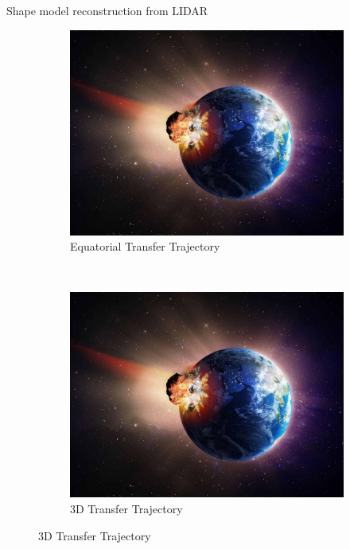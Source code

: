 \documentclass[final, usenames, dvipsnames]{beamer}
\newlength{\twocolwidth}
\begin{document}
\begin{frame}[t]
\begin{columns}[T,onlytextwidth]
\begin{column}{\twocolwidth}
\begin{block}{Shape model reconstruction from LIDAR}
\begin{figure}[htbp] 
    \centering 
    \begin{subfigure}[htbp]{0.5\textwidth} 
        \includegraphics[width=\textwidth,draft]{figures/asteroid-alamy.jpg} 
        \caption{Equatorial Transfer Trajectory}
    \end{subfigure}~ %
    \begin{subfigure}[htbp]{0.5\textwidth} 
        \includegraphics[width=\textwidth,draft]{figures/asteroid-alamy.jpg} 
        \caption*{3D Transfer Trajectory}
    \end{subfigure}
 

\end{figure}
\end{block}
\end{column}
\end{columns}
\end{frame}
\end{document}

